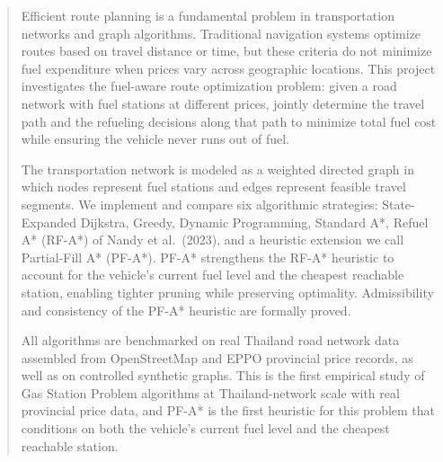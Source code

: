 \documentclass[12pt, a4paper, oneside]{report}
\theoremstyle{definition}
\theoremstyle{remark}
\begin{document}
\begin{abstract}
\thispagestyle{plain}

Efficient route planning is a fundamental problem in transportation networks and graph
algorithms.
Traditional navigation systems optimize routes based on travel distance or time, but these
criteria do not minimize fuel expenditure when prices vary across geographic locations.
This project investigates the fuel-aware route optimization problem: given a road network
with fuel stations at different prices, jointly determine the travel path and the refueling
decisions along that path to minimize total fuel cost while ensuring the vehicle never runs out
of fuel.

The transportation network is modeled as a weighted directed graph in which nodes represent
fuel stations and edges represent feasible travel segments.
We implement and compare six algorithmic strategies: State-Expanded Dijkstra, Greedy,
Dynamic Programming, Standard A*, Refuel A* (RF-A*) of Nandy et al.~(2023), and a
heuristic extension we call Partial-Fill A* (PF-A*).
PF-A* strengthens the RF-A* heuristic to account for the vehicle's current fuel level and the
cheapest reachable station, enabling tighter pruning while preserving optimality.
Admissibility and consistency of the PF-A* heuristic are formally proved.

All algorithms are benchmarked on real Thailand road network data assembled from
OpenStreetMap and EPPO provincial price records, as well as on controlled synthetic graphs.
This is the first empirical study of Gas Station Problem algorithms at Thailand-network scale
with real provincial price data, and PF-A* is the first heuristic for this problem that
conditions on both the vehicle's current fuel level and the cheapest reachable station.
\end{abstract}

\setcounter{page}{2}   %
\tableofcontents
\listoftables
\listoffigures

\end{document}
